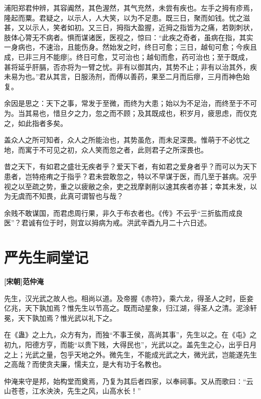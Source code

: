 \documentclass[UTF8,titlepage,oneside]{ctexbook}
\begin{document}
浦阳郑君仲辨，其容阗然，其色渥然，其气充然，未尝有疾也。左手之拇有疹焉，隆起而粟。君疑之，以示人，人大笑，以为不足患。既三日，聚而如钱。忧之滋甚，又以示人，笑者如初。又三日，拇指大盈握，近拇之指皆为之痛，若剟刺状，肢体心膂无不病者。惧而谋诸医，医视之，惊曰：“此疾之奇者，虽病在指，其实一身病也，不速治，且能伤身。然始发之时，终日可愈；三日，越旬可愈；今疾且成，已非三月不能瘳[。终日可愈，艾可治也；越旬而愈，药可治也；至于既成，甚将延乎肝膈，否亦将为一臂之忧。非有以御其内，其势不止；非有以治其外，疾未易为也。”君从其言，日服汤剂，而傅以善药，果至二月而后瘳，三月而神色始复。


余因是思之：天下之事，常发于至微，而终为大患；始以为不足治，而终至于不可为。当其易也，惜旦夕之力，忽之而不顾；及其既成也，积岁月，疲思虑，而仅克之，如此指者多矣。


盖众人之所可知者，众人之所能治也，其势虽危，而未足深畏。惟萌于不必忧之地，而寓于不可见之初，众人笑而忽之者，此则君子之所深畏也。


昔之天下，有如君之盛壮无疾者乎？爱天下者，有如君之爱身者乎？而可以为天下患者，岂特疮痏之于指乎？君未尝敢忽之，特以不早谋于医，而几至于甚病。况乎视之以至疏之势，重之以疲敝之余，吏之戕摩剥削以速其疾者亦甚；幸其未发，以为无虞而不知畏，此真可谓智也与哉？


余贱不敢谋国，而君虑周行果，非久于布衣者也。《传》不云乎“三折肱而成良医”？君诚有位于时，则宜以拇病为戒。洪武辛酉九月二十六日述。



\chapter*{严先生祠堂记}
\begin{center}
	\textbf{[宋朝]范仲淹}
\end{center}

先生，汉光武之故人也。相尚以道。及帝握《赤符》，乘六龙，得圣人之时，臣妾亿兆，天下孰加焉？惟先生以节高之。既而动星象，归江湖，得圣人之清。泥涂轩冕，天下孰加焉？惟光武以礼下之。


在《蛊》之上九，众方有为，而独“不事王侯，高尚其事”，先生以之。在《屯》之初九，阳德方亨，而能“以贵下贱，大得民也”，光武以之。盖先生之心，出乎日月之上；光武之量，包乎天地之外。微先生，不能成光武之大，微光武，岂能遂先生之高哉？而使贪夫廉，懦夫立，是大有功于名教也。


仲淹来守是邦，始构堂而奠焉，乃复为其后者四家，以奉祠事。又从而歌曰∶“云山苍苍，江水泱泱，先生之风，山高水长！”
\end{document}

